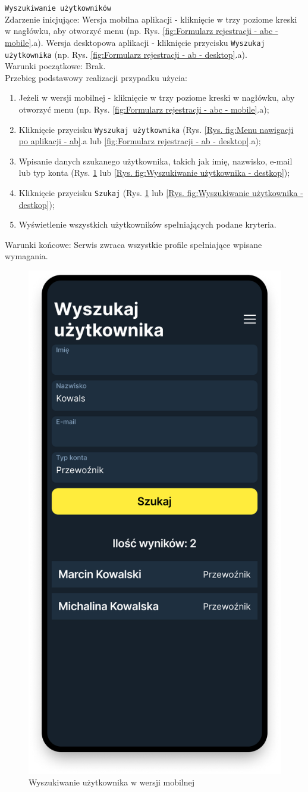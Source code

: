 \texttt{Wyszukiwanie użytkowników} \\
Zdarzenie inicjujące: Wersja mobilna aplikacji - kliknięcie w trzy poziome kreski w nagłówku, aby otworzyć menu (np. Rys. \ref{fig:Formularz rejestracji - abc - mobile}.a). Wersja desktopowa aplikacji - kliknięcie przycisku \texttt{Wyszukaj użytkownika} (np. Rys. \ref{fig:Formularz rejestracji - ab - desktop}.a). \\
Warunki początkowe: Brak. \\
Przebieg podstawowy realizacji przypadku użycia:
\begin{enumerate}
    \item Jeżeli w wersji mobilnej - kliknięcie w trzy poziome kreski w nagłówku, aby otworzyć menu (np. Rys. \ref{fig:Formularz rejestracji - abc - mobile}.a);
    \item Kliknięcie przycisku \texttt{Wyszukaj użytkownika} (Rys. \ref{Rys. fig:Menu nawigacji po aplikacji - ab}.a lub \ref{fig:Formularz rejestracji - ab - desktop}.a);
    \item Wpisanie danych szukanego użytkownika, takich jak imię, nazwisko, e-mail lub typ konta (Rys. \ref{Rys. fig:Wyszukiwanie użytkownika - mobile} lub \ref{Rys. fig:Wyszukiwanie użytkownika - destkop});
    \item Kliknięcie przycisku \texttt{Szukaj} (Rys. \ref{Rys. fig:Wyszukiwanie użytkownika - mobile} lub \ref{Rys. fig:Wyszukiwanie użytkownika - destkop});
    \item Wyświetlenie wszystkich użytkowników spełniających podane kryteria.
\end{enumerate}
Warunki końcowe: Serwis zwraca wszystkie profile spełniające wpisane wymagania.\\
\begin{figure}[H]
	\centering
		\includegraphics[width=0.3\linewidth]{rozdzial1/szukaj_uzytkownika_m.png}
	\caption{Wyszukiwanie użytkownika w wersji mobilnej}
	\label{Rys. fig:Wyszukiwanie użytkownika - mobile}
\end{figure}
